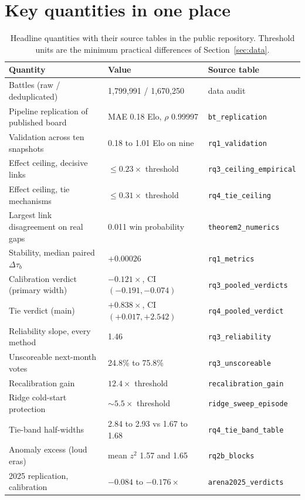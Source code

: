 \documentclass[10pt]{article}
\begin{document}
\section{Key quantities in one place}\label{app:numbers}

\begin{table}[h]
\centering
\small
\begin{tabular}{lll}
\toprule
Quantity & Value & Source table \\
\midrule
Battles (raw / deduplicated) & 1{,}799{,}991 / 1{,}670{,}250 & data audit \\
Pipeline replication of published board & MAE 0.18 Elo, $\rho$ 0.99997 & \texttt{bt\_replication} \\
Validation across ten snapshots & 0.18 to 1.01 Elo on nine & \texttt{rq1\_validation} \\
Effect ceiling, decisive links & $\leq 0.23\times$ threshold & \texttt{rq3\_ceiling\_empirical} \\
Effect ceiling, tie mechanisms & $\leq 0.31\times$ threshold & \texttt{rq4\_tie\_ceiling} \\
Largest link disagreement on real gaps & 0.011 win probability & \texttt{theorem2\_numerics} \\
Stability, median paired $\Delta\tau_b$ & $+0.00026$ & \texttt{rq1\_metrics} \\
Calibration verdict (primary width) & $-0.121\times$, CI $(-0.191, -0.074)$ & \texttt{rq3\_pooled\_verdicts} \\
Tie verdict (main) & $+0.838\times$, CI $(+0.017, +2.542)$ & \texttt{rq4\_pooled\_verdict} \\
Reliability slope, every method & 1.46 & \texttt{rq3\_reliability} \\
Unscoreable next-month votes & 24.8\% to 75.8\% & \texttt{rq3\_unscoreable} \\
Recalibration gain & $12.4\times$ threshold & \texttt{recalibration\_gain} \\
Ridge cold-start protection & ${\sim}5.5\times$ threshold & \texttt{ridge\_sweep\_episode} \\
Tie-band half-widths & 2.84 to 2.93 vs 1.67 to 1.68 & \texttt{rq4\_tie\_band\_table} \\
Anomaly excess (loud eras) & mean $z^2$ 1.57 and 1.65 & \texttt{rq2b\_blocks} \\
2025 replication, calibration & $-0.084$ to $-0.176\times$ & \texttt{arena2025\_verdicts} \\
\bottomrule
\end{tabular}
\caption{Headline quantities with their source tables in the public
repository. Threshold units are the minimum practical differences of
Section~\ref{sec:data}.}
\end{table}
\end{document}
